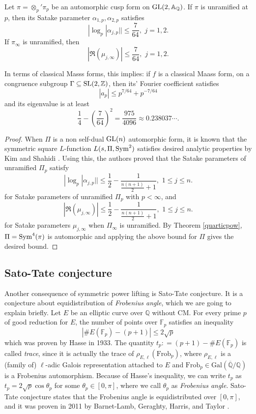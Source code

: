 \begin{theorem}
Let $\pi = \otimes_{p}'\pi_{p}$ be an automorphic cusp form on $\operatorname{\mathrm{GL}}(2, \mathbb{A}_{\mathbb{Q}})$.
If $\pi$ is unramified at $p$, then its Satake parameter $\alpha_{1, p}, \alpha_{2, p}$ satisfies
$$
|\log_{p}|\alpha_{j, p}|| \leq \frac{7}{64},\,\, j = 1, 2.
$$
If $\pi_{\infty}$ is unramified, then
$$
|\Re(\mu_{j, \infty})|\leq \frac{7}{64},\,\,j = 1, 2.
$$
\end{theorem}
In terms of classical Masss forms, this implies: if $f$ is a classical Maass form,
on a congruence subgroup $\Gamma \subseteq \operatorname{\mathrm{SL}}(2, \mathbb{Z})$,
then its' Fourier coefficient satisfies
$$
|a_{p}| \leq p^{7/64} + p^{-7/64}
$$
and its eigenvalue is at least
$$
\frac{1}{4} - \left(\frac{7}{64}\right)^{2} = \frac{975}{4096} \approx 0.238037\cdots.
$$
\begin{proof}
When $\Pi$ is a non self-dual $\operatorname{\mathrm{GL}}(n)$ automorphic form, it is known that the symmetric square $L$-function $L(s, \Pi, \mathrm{Sym}^{2})$
satisfies desired analytic properties by Kim and Shahidi \cite{kim1999langlands,shahidi1988ramanujan}.
Using this, the authors proved that the Satake parameters of unramified $\Pi_{p}$ satisfy
$$
|\log_{p}|\alpha_{j, p}|| \leq \frac{1}{2} - \frac{1}{\frac{n(n+1)}{2} + 1},\,\, 1\leq j \leq n.
$$
for Satake parameters of unramified $\Pi_{p}$ with $p <\infty$, and
$$
|\Re(\mu_{j, \infty})|\leq \frac{1}{2} - \frac{1}{\frac{n(n+1)}{2} + 1},\,\, 1\leq j \leq n.
$$
for Satake parameters $\mu_{j, \infty}$ when $\Pi_{\infty}$ is unramified.
By Theorem \ref{quarticpow}, $\Pi = \mathrm{Sym}^{4}(\pi)$ is automorphic 
and applying the above bound for $\Pi$ gives the desired bound.
\end{proof}


\subsection{Sato-Tate conjecture}

Another consequence of symmetric power lifting is Sato-Tate conjecture.
It is a conjecture about equidistribution of \emph{Frobenius angle}, which we are going to explain briefly.
Let $E$ be an elliptic curve over $\mathbb{Q}$ without CM.
For every prime $p$ of good reduction for $E$, the number of points over $\mathbb{F}_{p}$ satisfies an inequality
$$
|\#E(\mathbb{F}_{p}) - (p + 1)| \leq 2\sqrt{p}
$$
which was proven by Hasse in 1933. The quantity $t_{p} : = (p + 1) - \#E(\mathbb{F}_{p})$ is called
\emph{trace}, since it is actually the trace of $\rho_{E, \ell}(\mathrm{Frob}_{p})$, where
$\rho_{E, \ell}$ is a (family of) $\ell$-adic Galois representation attached to $E$ and $\mathrm{Frob}_{p} \in \mathrm{Gal}(\overline{\mathbb{Q}} / \mathbb{Q})$
is a Frobenius automorphism.
Because of Hasse's inequality, we can write $t_{p}$ as $t_{p} = 2\sqrt{p}\cos\theta_{p}$ for some $\theta_{p} \in [0, \pi]$,
where we call $\theta_{p}$ as \emph{Frobenius angle}.
Sato-Tate conjecture states that the Frobenius angle is equidistributed over $[0, \pi]$,
and it was proven in 2011 by Barnet-Lamb, Geraghty, Harris, and Taylor \cite{barnet2011family}.

